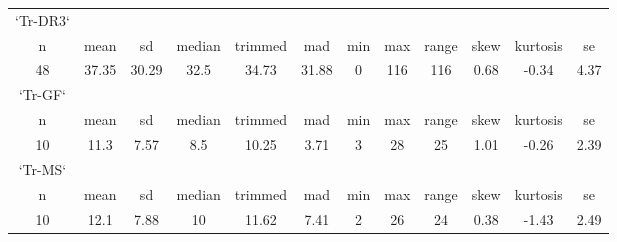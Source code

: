 \documentclass{article}
\begin{document}
\begin{tabular}{c c c c c c c c c c c c }
`Tr-DR3`&&&&&&&&&&&\\
  n &mean   &sd& median &trimmed & mad &min &max &range &skew &kurtosis &  se\\
     48 &37.35 &30.29  & 32.5  & 34.73 &31.88 &  0 &116 &  116& 0.68 &   -0.34 &4.37\\

`Tr-GF`&&&&&&&&&&&\\
  n &mean   &sd& median &trimmed & mad &min &max &range &skew &kurtosis &  se\\
     10& 11.3 &7.57 &   8.5 &  10.25 &3.71&   3  &28 &   25& 1.01&    -0.26 &2.39\\

`Tr-MS`&&&&&&&&&&&\\
  n &mean   &sd& median &trimmed & mad &min &max &range &skew &kurtosis &  se\\
     10& 12.1& 7.88 &    10&   11.62& 7.41&   2  &26&    24 &0.38&    -1.43& 2.49\\
     \end{tabular}

\newpage
\end{document}
